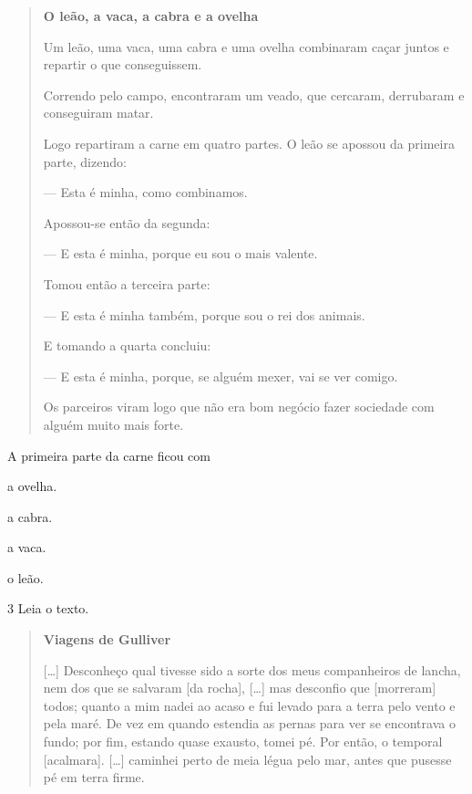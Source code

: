 \begin{quote}
\textbf{O leão, a vaca, a cabra e a ovelha}

Um leão, uma vaca, uma cabra e uma ovelha combinaram
caçar juntos e repartir o que conseguissem.

Correndo pelo campo, encontraram um veado, que
cercaram, derrubaram e conseguiram matar.

Logo repartiram a carne em quatro partes. O leão se
apossou da primeira parte, dizendo:

--- Esta é minha, como combinamos.

Apossou-se então da segunda:

--- E esta é minha, porque eu sou o mais valente.

Tomou então a terceira parte:

--- E esta é minha também, porque sou o rei dos
animais.

E tomando a quarta concluiu:

--- E esta é minha, porque, se alguém mexer, vai se ver
comigo.

Os parceiros viram logo que não era bom negócio fazer
sociedade com alguém muito mais forte.

\end{quote}

A primeira parte da carne ficou com

\begin{escolha}
\item a ovelha.

\item a cabra.

\item a vaca.

\item o leão.
\end{escolha}



\num{3} Leia o texto.

\begin{quote}
\textbf{Viagens de Gulliver}

{[}\ldots{}{]} Desconheço qual tivesse sido a sorte dos meus
companheiros de lancha, nem dos que se salvaram [da rocha],
{[}\ldots{}{]} mas desconfio que [morreram] todos; quanto a mim nadei ao
acaso e fui levado para a terra pelo vento e pela maré. De vez em quando
estendia as pernas para ver se encontrava o fundo; por fim, estando
quase exausto, tomei pé. Por então, o temporal [acalmara]. {[}\ldots{}{]}
caminhei perto de meia légua pelo mar, antes que pusesse pé em terra
firme.

\end{quote}

